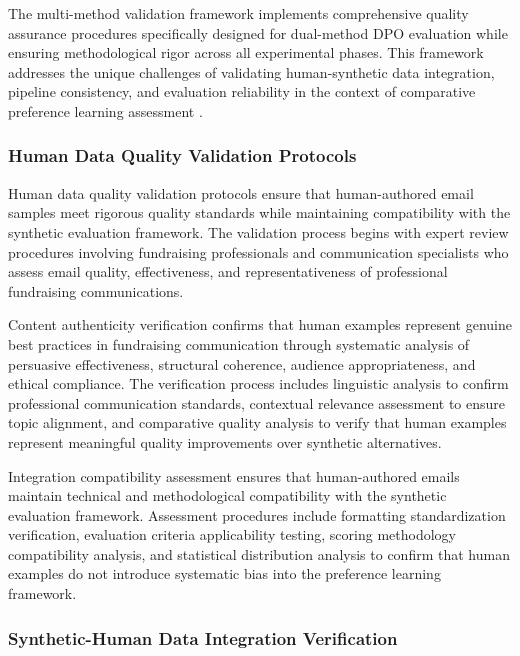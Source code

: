 The multi-method validation framework implements comprehensive quality assurance procedures specifically designed for dual-method DPO evaluation while ensuring methodological rigor across all experimental phases. This framework addresses the unique challenges of validating human-synthetic data integration, pipeline consistency, and evaluation reliability in the context of comparative preference learning assessment \cite{chen2024reproducibility_hci, yin2024reproducibility_ml}.

\subsubsection{Human Data Quality Validation Protocols}

Human data quality validation protocols ensure that human-authored email samples meet rigorous quality standards while maintaining compatibility with the synthetic evaluation framework. The validation process begins with expert review procedures involving fundraising professionals and communication specialists who assess email quality, effectiveness, and representativeness of professional fundraising communications.

Content authenticity verification confirms that human examples represent genuine best practices in fundraising communication through systematic analysis of persuasive effectiveness, structural coherence, audience appropriateness, and ethical compliance. The verification process includes linguistic analysis to confirm professional communication standards, contextual relevance assessment to ensure topic alignment, and comparative quality analysis to verify that human examples represent meaningful quality improvements over synthetic alternatives.

Integration compatibility assessment ensures that human-authored emails maintain technical and methodological compatibility with the synthetic evaluation framework. Assessment procedures include formatting standardization verification, evaluation criteria applicability testing, scoring methodology compatibility analysis, and statistical distribution analysis to confirm that human examples do not introduce systematic bias into the preference learning framework.

\subsubsection{Synthetic-Human Data Integration Verification}


